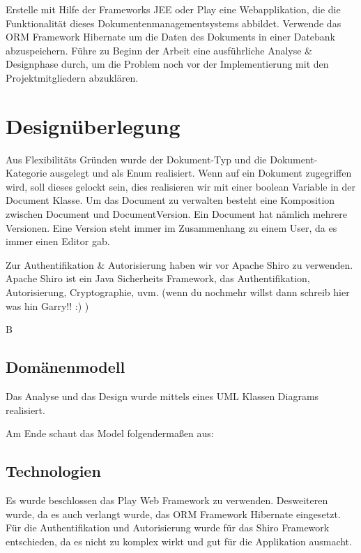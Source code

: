 \documentclass[11pt, a4paper]{article}
\begin{document}
Erstelle mit Hilfe der Frameworks JEE oder Play eine Webapplikation, die die Funktionalität dieses Dokumentenmanagementsystems abbildet. Verwende das ORM Framework Hibernate um die Daten des Dokuments in einer Datebank abzuspeichern. Führe zu Beginn der Arbeit eine ausführliche Analyse \& Designphase durch, um die Problem noch vor der Implementierung mit den Projektmitgliedern abzuklären.

\section{Designüberlegung}

Aus Flexibilitäts Gründen wurde der Dokument-Typ und die Dokument-Kategorie ausgelegt und als Enum realisiert. Wenn auf ein Dokument zugegriffen wird,
soll dieses gelockt sein, dies realisieren wir mit einer boolean Variable in der Document Klasse. Um das Document zu verwalten besteht eine Komposition zwischen Document und DocumentVersion. Ein Document hat nämlich mehrere Versionen. Eine Version steht immer im Zusammenhang zu einem User, da es immer einen Editor gab.



Zur Authentifikation & Autorisierung haben wir vor Apache Shiro zu verwenden. Apache Shiro ist ein Java Sicherheits Framework, das Authentifikation, Autorisierung,
Cryptographie, uvm. (wenn du nochmehr willst dann schreib hier was hin Garry!! :) )

B
\subsection{Domänenmodell}
Das Analyse und das Design wurde mittels eines UML Klassen Diagrams realisiert.



Am Ende schaut das Model folgendermaßen aus:



\subsection{Technologien}

Es wurde beschlossen das Play Web Framework zu verwenden. Desweiteren wurde, da es auch verlangt wurde, das ORM Framework Hibernate eingesetzt. Für die Authentifikation und Autorisierung wurde für das Shiro Framework entschieden, da es nicht zu komplex wirkt und gut für die Applikation ausmacht. 
\end{document}
